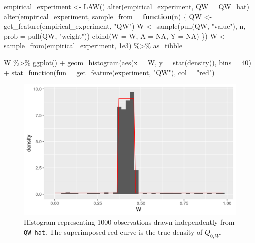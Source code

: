 \documentclass[
  11pt,
  openright,twoside]{book}
\newenvironment{Shaded}{\begin{snugshade}}{\end{snugshade}}
\newcommand{\AttributeTok}[1]{\textcolor[rgb]{0.77,0.63,0.00}{#1}}
\newcommand{\ConstantTok}[1]{\textcolor[rgb]{0.00,0.00,0.00}{#1}}
\newcommand{\ControlFlowTok}[1]{\textcolor[rgb]{0.13,0.29,0.53}{\textbf{#1}}}
\newcommand{\DecValTok}[1]{\textcolor[rgb]{0.00,0.00,0.81}{#1}}
\newcommand{\FloatTok}[1]{\textcolor[rgb]{0.00,0.00,0.81}{#1}}
\newcommand{\FunctionTok}[1]{\textcolor[rgb]{0.00,0.00,0.00}{#1}}
\newcommand{\NormalTok}[1]{#1}
\newcommand{\OtherTok}[1]{\textcolor[rgb]{0.56,0.35,0.01}{#1}}
\newcommand{\SpecialCharTok}[1]{\textcolor[rgb]{0.00,0.00,0.00}{#1}}
\newcommand{\StringTok}[1]{\textcolor[rgb]{0.31,0.60,0.02}{#1}}
\theoremstyle{definition}
\theoremstyle{definition}
\theoremstyle{definition}
\theoremstyle{definition}
\theoremstyle{remark}
\begin{document}
\begin{Shaded}
\begin{Highlighting}[]
\NormalTok{empirical\_experiment }\OtherTok{\textless{}{-}} \FunctionTok{LAW}\NormalTok{()}
\FunctionTok{alter}\NormalTok{(empirical\_experiment, }\AttributeTok{QW =}\NormalTok{ QW\_hat)}
\FunctionTok{alter}\NormalTok{(empirical\_experiment, }\AttributeTok{sample\_from =} \ControlFlowTok{function}\NormalTok{(n) \{}
\NormalTok{  QW }\OtherTok{\textless{}{-}} \FunctionTok{get\_feature}\NormalTok{(empirical\_experiment, }\StringTok{"QW"}\NormalTok{)}
\NormalTok{  W }\OtherTok{\textless{}{-}} \FunctionTok{sample}\NormalTok{(}\FunctionTok{pull}\NormalTok{(QW, }\StringTok{"value"}\NormalTok{), n, }\AttributeTok{prob =} \FunctionTok{pull}\NormalTok{(QW, }\StringTok{"weight"}\NormalTok{))}
  \FunctionTok{cbind}\NormalTok{(}\AttributeTok{W =}\NormalTok{ W, }\AttributeTok{A =} \ConstantTok{NA}\NormalTok{, }\AttributeTok{Y =} \ConstantTok{NA}\NormalTok{)}
\NormalTok{\})}
\NormalTok{W }\OtherTok{\textless{}{-}} \FunctionTok{sample\_from}\NormalTok{(empirical\_experiment, }\FloatTok{1e3}\NormalTok{) }\SpecialCharTok{\%\textgreater{}\%}\NormalTok{ as\_tibble}

\NormalTok{W }\SpecialCharTok{\%\textgreater{}\%}
\FunctionTok{ggplot}\NormalTok{() }\SpecialCharTok{+}
  \FunctionTok{geom\_histogram}\NormalTok{(}\FunctionTok{aes}\NormalTok{(}\AttributeTok{x =}\NormalTok{ W, }\AttributeTok{y =} \FunctionTok{stat}\NormalTok{(density)), }\AttributeTok{bins =} \DecValTok{40}\NormalTok{) }\SpecialCharTok{+}
  \FunctionTok{stat\_function}\NormalTok{(}\AttributeTok{fun =} \FunctionTok{get\_feature}\NormalTok{(experiment, }\StringTok{"QW"}\NormalTok{), }\AttributeTok{col =} \StringTok{"red"}\NormalTok{)}
\end{Highlighting}
\end{Shaded}

\begin{figure}

{\centering \includegraphics[width=0.7\linewidth]{img/estimate-QW-two-1} 

}

\caption{Histogram representing 1000 observations drawn independently from \texttt{QW\_hat}. The superimposed red curve is the true density of \(Q_{0,W}\).}\label{fig:estimate-QW-two}
\end{figure}
\end{document}
